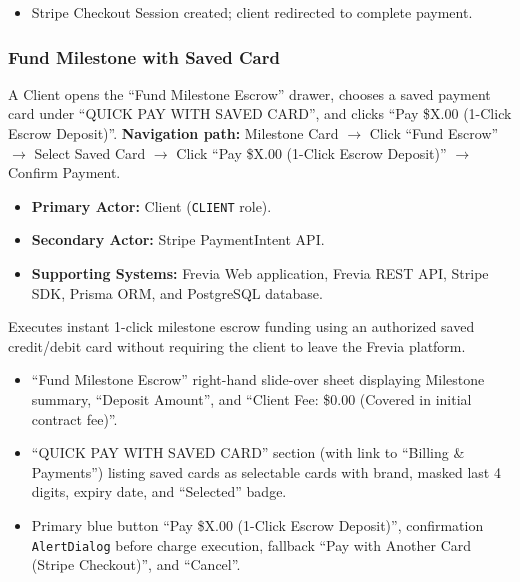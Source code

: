 \begin{itemize}[leftmargin=1.6em,topsep=3pt,itemsep=2pt,parsep=0pt,label=$\bullet$]
      \item Stripe Checkout Session created; client redirected to complete payment.
\end{itemize}

\subsubsection{ Fund Milestone with Saved Card}

A Client opens the ``Fund Milestone Escrow'' drawer, chooses a saved payment card under ``QUICK PAY WITH SAVED CARD'', and clicks ``Pay \$X.00 (1-Click Escrow Deposit)''.\newline
\textbf{Navigation path:} Milestone Card $\rightarrow$ Click ``Fund Escrow'' $\rightarrow$ Select Saved Card $\rightarrow$ Click ``Pay \$X.00 (1-Click Escrow Deposit)'' $\rightarrow$ Confirm Payment.


\begin{itemize}[leftmargin=1.6em,topsep=3pt,itemsep=2pt,parsep=0pt,label=$\bullet$]
      \item \textbf{Primary Actor:} Client (\texttt{CLIENT} role).
      \item \textbf{Secondary Actor:} Stripe PaymentIntent API.
      \item \textbf{Supporting Systems:} Frevia Web application, Frevia REST API, Stripe SDK, Prisma ORM, and PostgreSQL database.
\end{itemize}

\noindent Executes instant 1-click milestone escrow funding using an authorized saved credit/debit card without requiring the client to leave the Frevia platform.

\begin{itemize}[leftmargin=1.6em,topsep=3pt,itemsep=2pt,parsep=0pt,label=$\bullet$]
      \item ``Fund Milestone Escrow'' right-hand slide-over sheet displaying Milestone summary, ``Deposit Amount'', and ``Client Fee: \$0.00 (Covered in initial contract fee)''.
      \item ``QUICK PAY WITH SAVED CARD'' section (with link to ``Billing \& Payments'') listing saved cards as selectable cards with brand, masked last 4 digits, expiry date, and ``Selected'' badge.
      \item Primary blue button ``Pay \$X.00 (1-Click Escrow Deposit)'', confirmation \texttt{AlertDialog} before charge execution, fallback ``Pay with Another Card (Stripe Checkout)'', and ``Cancel''.
\end{itemize}

